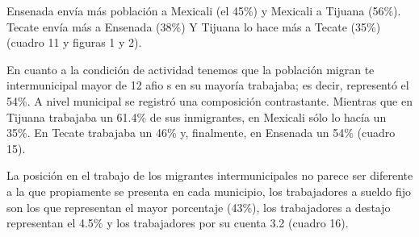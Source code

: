 \documentclass{article}
\begin{document}
Ensenada envía más población a Mexicali (el 45\%) y Mexicali a Tijuana (56\%). Tecate envía más a Ensenada (38\%) Y Tijuana lo hace más a Tecate (35\%) (cuadro 11 y figuras 1 y 2).

En cuanto a la condición de actividad tenemos que la población migran te intermunicipal mayor de 12 afio s en su mayoría trabajaba; es decir, representó el 54\%. A nivel municipal se registró una composición contrastante. Mientras que en Tijuana trabajaba un 61.4\% de sus inmigrantes, en Mexicali sólo lo hacía un 35\%. En Tecate trabajaba un 46\% y, finalmente, en Ensenada un 54\% (cuadro 15).

La posición en el trabajo de los migrantes intermunicipales no parece ser diferente a la que propiamente se presenta en cada municipio, los trabajadores a sueldo fijo son los que representan el mayor porcentaje (43\%), los trabajadores a destajo representan el 4.5\% y los trabajadores por su cuenta 3.2 (cuadro 16).
\end{document}
